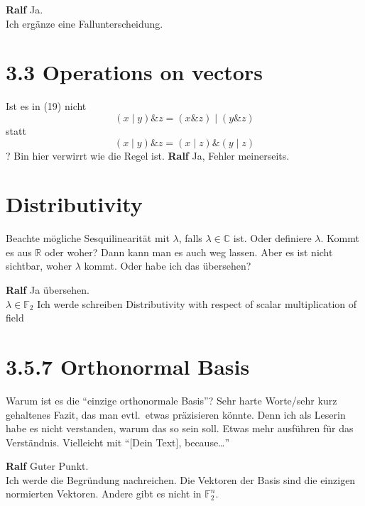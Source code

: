 \documentclass[a4paper]{article}
\begin{document}
{\bf Ralf} Ja. \\
Ich ergänze eine Fallunterscheidung.


\section*{3.3 Operations on vectors}
Ist es in (19) nicht
\[
  (x \mid y)\& z = (x\& z) \mid (y \& z)
\]
statt
\[
  (x \mid y)\& z = (x \mid z)\& (y \mid z)
\]?
Bin hier verwirrt wie die Regel ist.
{\bf Ralf} Ja, Fehler meinerseits.\\

\section*{Distributivity}
Beachte m\"ogliche Sesquilinearit\"at mit $\lambda$, falls $\lambda\in\mathbb{C}$ ist.
Oder definiere $\lambda$. Kommt es aus $\mathbb{R}$ oder woher? Dann kann man es auch weg lassen.
Aber es ist nicht sichtbar, woher $\lambda$ kommt. Oder habe ich das \"ubersehen?

{\bf Ralf} Ja übersehen. \\
$\lambda \in \mathbb{F}_2$
Ich werde schreiben Distributivity with respect of scalar multiplication of field

\section*{3.5.7 Orthonormal Basis}
Warum ist es die ``einzige orthonormale Basis''? Sehr harte Worte/sehr kurz gehaltenes Fazit,
das man evtl.\ etwas pr\"azisieren k\"onnte. Denn ich als Leserin habe es nicht verstanden,
warum das so sein soll. Etwas mehr ausf\"uhren f\"ur das Verst\"andnis. Vielleicht mit
``[Dein Text], because\ldots''

{\bf Ralf} Guter Punkt. \\
Ich werde die Begründung nachreichen. Die Vektoren der Basis sind die einzigen normierten Vektoren. Andere gibt es nicht in
 $\mathbb{F}_2^n$.
\end{document}
